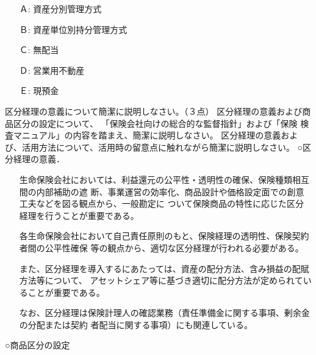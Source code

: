 \documentclass[report,gutter=10mm,fore-edge=10mm,uplatex,dvipdfmx]{jlreq}
\begin{document}
\answer{}
\begin{itemize}
\item[ Ａ: ] 資産分別管理方式
\item[ Ｂ: ] 資産単位別持分管理方式
\item[ Ｃ: ] 無配当
\item[ Ｄ: ] 営業用不動産
\item[ Ｅ: ] 現預金
\end{itemize}

区分経理の意義について簡潔に説明しなさい。（３点）
区分経理の意義および商品区分の設定について、
「保険会社向けの総合的な監督指針」および「保険
検査マニュアル」の内容を踏まえ、簡潔に説明しなさい。
区分経理の意義および、活用方法について、活用時の留意点に触れながら簡潔に説明しなさい。
\answer{}
\noindent ○区分経理の意義．
\begin{itemize}
\item[] 生命保険会社においては、利益還元の公平性・透明性の確保、保険種類相互間の内部補助の遮
 断、事業運営の効率化、商品設計や価格設定面での創意工夫などを図る観点から、一般勘定に
 ついて保険商品の特性に応じた区分経理を行うことが重要である。
\item[] 各生命保険会社において自己責任原則のもと、保険経理の透明性、保険契約者間の公平性確保
 等の観点から、適切な区分経理が行われる必要がある。
\item[] また、区分経理を導入するにあたっては、資産の配分方法、含み損益の配賦方法等について、
 アセットシェア等に基づき適切に配分方法が定められていることが重要である。
\item[] なお、区分経理は保険計理人の確認業務（責任準備金に関する事項、剰余金の分配または契約
 者配当に関する事項）にも関連している。
\end{itemize}
\noindent ○商品区分の設定
\end{document}
